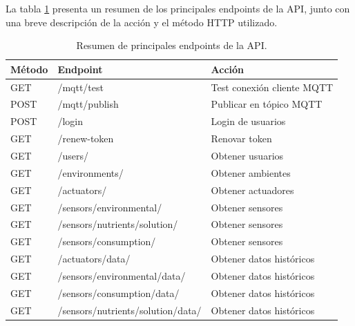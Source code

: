 La tabla \ref{tab:endpoints} presenta un resumen de los principales endpoints
de la API, junto con una breve descripción de la acción y el método HTTP
utilizado.

\begin{table}[H]
    \centering
    \caption[Resumen de principales endpoints de la API]{Resumen de principales endpoints de la API.}
    \begin{tabular}{l l l}
        \toprule
        \textbf{Método} & \textbf{Endpoint}                 & \textbf{Acción}            \\
        \midrule
        GET             & /mqtt/test                        & Test conexión cliente MQTT \\
        POST            & /mqtt/publish                     & Publicar en tópico MQTT    \\
        \midrule
        POST            & /login                            & Login de usuarios          \\
        GET             & /renew-token                      & Renovar token              \\
        \midrule
        GET             & /users/                           & Obtener usuarios           \\
        \midrule
        GET             & /environments/                    & Obtener ambientes          \\
        \midrule
        GET             & /actuators/                       & Obtener actuadores         \\
        \midrule
        GET             & /sensors/environmental/           & Obtener sensores           \\
        \midrule
        GET             & /sensors/nutrients/solution/      & Obtener sensores           \\
        \midrule
        GET             & /sensors/consumption/             & Obtener sensores           \\
        \midrule
        GET             & /actuators/data/                  & Obtener datos históricos   \\
        GET             & /sensors/environmental/data/      & Obtener datos históricos   \\
        GET             & /sensors/consumption/data/        & Obtener datos históricos   \\
        GET             & /sensors/nutrients/solution/data/ & Obtener datos históricos   \\
        \bottomrule
        \hline
    \end{tabular}
    \label{tab:endpoints}
\end{table}

